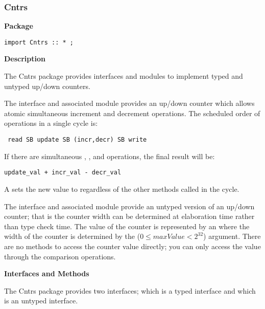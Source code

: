 \subsubsection{Cntrs}
\label{sec-Cntrs}


{\bf Package}

\begin{verbatim}
import Cntrs :: * ;
\end{verbatim}

{\bf Description}

The Cntrs package provides  interfaces and modules to implement
 typed and  untyped up/down counters.  

The  interface and associated  module provides
an 
up/down counter which allows atomic simultaneous increment and
decrement operations.  The scheduled order of operations in a single cycle is:
\begin{verbatim}
 read SB update SB (incr,decr) SB write
\end{verbatim}

If there are simultaneous , , and 
operations, the final result will be:
\begin{verbatim}
update_val + incr_val - decr_val
\end{verbatim}
A  sets the new value to  regardless of the
other methods called in the  cycle.

The  interface and associated  module provide
an untyped version of an up/down counter; that is the counter width
can be determined at elaboration time rather than type check time.
The value of the counter is represented by an  where the
width of the counter is determined by the  ($0 \leq
maxValue <  2^{32}$) argument.  There are no methods to access the
counter value directly; you can only access the value through the
comparison operations.

{\bf Interfaces and Methods}

The Cntrs package provides two interfaces;  which is a typed
interface and  which is an untyped interface.  

